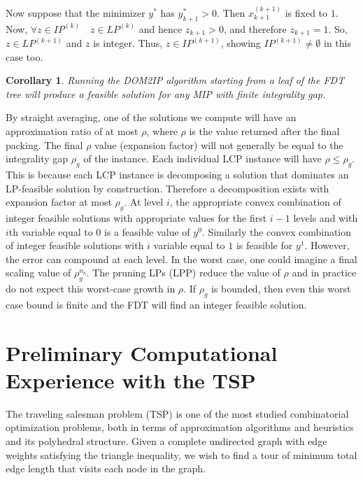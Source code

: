 \documentclass[11pt]{article}
\newtheorem{corollary}{Corollary}
\begin{document}
Now suppose that the minimizer $y^*$ has $y^*_{k+1}>0$.  Then $x^{(k+1)}_
{k+1}$ is fixed to $1$.  Now, $\forall z\in IP^{(k)}\quad z\in LP^{(k)}$ 
and hence $z_{k+1}>0$, and therefore $z_{k+1}=1$.  So, $z \in LP^{(k+1)}$ 
and $z$ is integer.  Thus, $z\in IP^{(k+1)}$, showing  
$IP^{(k+1)}\neq \emptyset$ in this case too.  \hfill \framebox  

\begin{corollary}
Running the DOM2IP algorithm starting from a leaf of the FDT tree will produce
a feasible solution for any MIP with finite integrality gap.
\end{corollary}

By straight averaging, one of the solutions we compute will have an
approximation ratio of at most $\rho$, where $\rho$ is the value
returned after the final packing.  The final $\rho$ value (expansion
factor) will not generally be equal to the integrality gap $\rho_g$ of
the instance.  Each individual LCP instance will have $\rho \le
\rho_g$.  This is because each LCP instance is decomposing a solution
that dominates an LP-feasible solution by construction.  Therefore a
decomposition exists with expansion factor at most $\rho_g$.  At level
$i$, the appropriate convex combination of integer feasible solutions
with appropriate values for the first $i-1$ levels and with $i$th
variable equal to $0$ is a feasible value of $y^0$. Similarly the
convex combination of integer feasible solutions with $i$ variable
equal to $1$ is feasible for $y^1$.  However, the error can compound
at each level.  In the worst case, one could imagine a final scaling
value of $\rho_g^{n_b}$.  The pruning LPs (LPP) reduce the value of
$\rho$ and in practice do not expect this worst-case growth in $\rho$.
If $\rho_g$ is bounded, then even this worst case bound is finite and
the FDT will find an integer feasible solution.

\section{Preliminary Computational Experience with the TSP}
\label{sec:tsp}

The traveling salesman problem (TSP) is one of the most studied
combinatorial optimization problems, both in terms of approximation
algorithms and heuristics and its polyhedral structure.  Given a
complete undirected graph with edge weights satisfying the triangle
inequality, we wish to find a tour of minimum total edge length that
visits each node in the graph.
\end{document}
